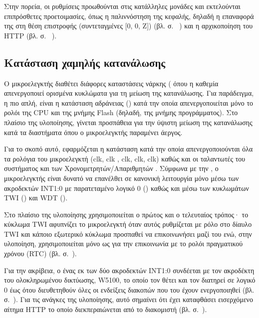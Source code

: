 Στην πορεία, οι ρυθμίσεις προωθούνται στις κατάλληλες μονάδες και εκτελούνται
επιπρόσθετες προετοιμασίες, όπως η παλιννόστηση της κεφαλής, δηλαδή η επαναφορά
της στη θέση επιστροφής (συντεταγμένες [0, 0, Z]) (βλ. σ.~%
\pageref{sec:motor:homing}) και η αρχικοποίηση του HTTP  (βλ. σ.~%
\pageref{ssubsec:network:port_mr}).


\subsection{Κατάσταση χαμηλής κατανάλωσης}

Ο μικροελεγκτής διαθέτει διάφορες καταστάσεις νάρκης (
όπου η καθεμία απενεργοποιεί ορισμένα κυκλώματα για τη μείωση της κατανάλωσης.
Για παράδειγμα, η πιο απλή, είναι η κατάσταση αδράνειας () κατά την
οποία απενεργοποιείται μόνο το ρολόι της CPU και της μνήμης Flash (δηλαδή, της
μνήμης προγράμματος). Στο πλαίσιο της υλοποίησης, γίνεται προσπάθεια για την
ύψιστη μείωση της κατανάλωσης κατά τα διαστήματα όπου ο μικροελεγκτής παραμένει
άεργος.

Για το σκοπό αυτό, εφαρμόζεται η κατάσταση  κατά την οποία
απενεργοποιούνται όλα τα ρολόγια του μικροελεγκτή (clk, clk%
, clk, clk, clk) καθώς και οι
ταλαντωτές του συστήματος και των Χρονομετρητών\slash{}Απαριθμητών \parencite%
[38]{atmel13}. Σύμφωνα με την \textcite[38]{atmel13}, ο μικροελεγκτής είναι
δυνατό να επανέλθει σε κανονική λειτουργία μόνο μέσω των ακροδεκτών INT1:0 με
παρατεταμένο λογικό 0 () καθώς και μέσω των κυκλωμάτων
TWI () και WDT ().

Στο πλαίσιο της υλοποίησης χρησιμοποιείται ο πρώτος και ο τελευταίος τρόπος· το
κύκλωμα TWI αφυπνίζει το μικροελεγκτή όταν αυτός ρυθμίζεται με ρόλο 
στο δίαυλο TWI και κάποιο εξωτερικό κύκλωμα προσπαθεί να επικοινωνήσει μαζί του
ενώ, στην υλοποίηση, χρησιμοποιείται μόνο ως  για την επικοινωνία με
το ρολόι πραγματικού χρόνου (RTC) (βλ.  σ.~\pageref{sec:rtc}).

Για την ακρίβεια, ο ένας εκ των δύο ακροδεκτών INT1:0 συνδέεται με τον ακροδέκτη
 του ολοκληρωμένου δικτύωσης, W5100, το οποίο τον θέτει και τον
διατηρεί σε λογικό 0 έως ότου διευθετηθούν όλες οι ενδείξεις διακοπών που του
έχουν ενεργοποιηθεί
(βλ.  σ.~\pageref{subsec:network:interface}).
Για τις ανάγκες της υλοποίησης, αυτό σημαίνει ότι έχει καταφθάσει εισερχόμενο
αίτημα HTTP το οποίο διεκπεραιώνεται από το διακομιστή (βλ.
 σ.~\pageref{sec:http-server}).

